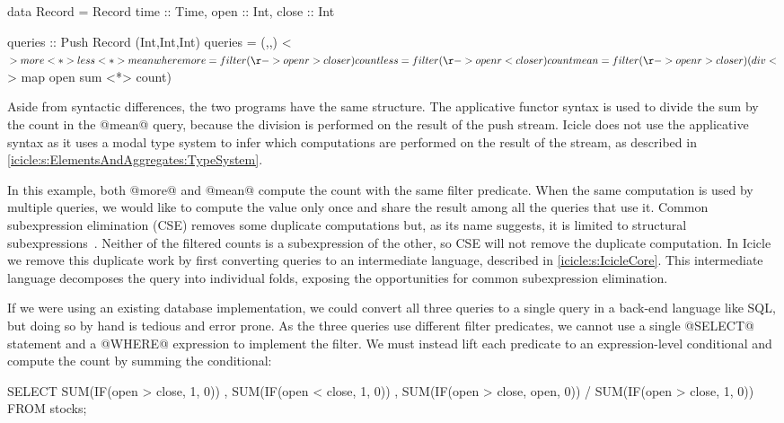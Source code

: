 \begin{haskell}
data Record = Record
 { time :: Time, open :: Int, close :: Int }

queries :: Push Record (Int,Int,Int)
queries = (,,) <$> more <*> less <*> mean
 where
  more = filter (\r -> open r > close r) count
  less = filter (\r -> open r < close r) count
  mean = filter (\r -> open r > close r) (div <$> map open sum <*> count)
\end{haskell}

Aside from syntactic differences, the two programs have the same structure.
The applicative functor syntax is used to divide the sum by the count in the @mean@ query, because the division is performed on the result of the push stream.
Icicle does not use the applicative syntax as it uses a modal type system to infer which computations are performed on the result of the stream, as described in \cref{icicle:s:ElementsAndAggregates:TypeSystem}.

In this example, both @more@ and @mean@ compute the count with the same filter predicate.
When the same computation is used by multiple queries, we would like to compute the value only once and share the result among all the queries that use it.
Common subexpression elimination (CSE) removes some duplicate computations but, as its name suggests, it is limited to structural subexpressions~\cite{chitil1997uncommon}.
Neither of the filtered counts is a subexpression of the other, so CSE will not remove the duplicate computation.
In Icicle we remove this duplicate work by first converting queries to an intermediate language, described in \cref{icicle:s:IcicleCore}.
This intermediate language decomposes the query into individual folds, exposing the opportunities for common subexpression elimination.

If we were using an existing database implementation, we could convert all three queries to a single query in a back-end language like SQL, but doing so by hand is tedious and error prone.
As the three queries use different filter predicates, we cannot use a single @SELECT@ statement and a @WHERE@ expression to implement the filter.
We must instead lift each predicate to an expression-level conditional and compute the count by summing the conditional:

\begin{sql}
  SELECT SUM(IF(open > close, 1,    0))
       , SUM(IF(open < close, 1,    0))
       , SUM(IF(open > close, open, 0))
       / SUM(IF(open > close, 1,    0))
  FROM stocks;
\end{sql}


